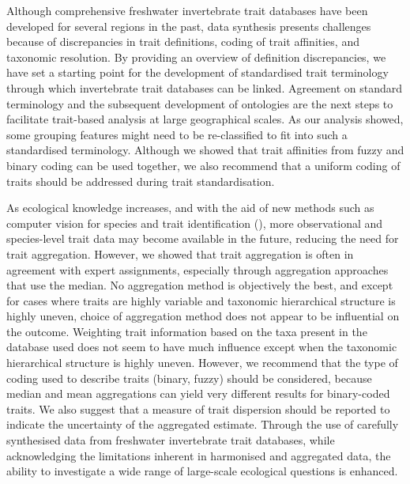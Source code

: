 \documentclass{article}
\begin{document}
Although comprehensive freshwater invertebrate trait databases have been developed for several regions in the past, data synthesis presents challenges because of discrepancies in trait definitions, coding of trait affinities, and taxonomic resolution. By providing an overview of definition discrepancies, we have set a starting point for the development of standardised trait terminology through which invertebrate trait databases can be linked. Agreement on standard terminology and the subsequent development of ontologies are the next steps to facilitate trait-based analysis at large geographical scales. As our analysis showed, some grouping features might need to be re-classified to fit into such a standardised terminology. Although we showed that trait affinities from fuzzy and binary coding can be used together, we also recommend that a uniform coding of traits should be addressed during trait standardisation. 

As ecological knowledge increases, and with the aid of new  methods such as computer vision for species and trait identification (\cite{hoye_deep_2020}), more observational and species-level trait data may become available in the future, reducing the need for trait aggregation. However, we showed that trait aggregation is often in agreement with expert assignments, especially through aggregation approaches that use the median. No aggregation method is objectively the best, and except for cases where traits are highly variable and taxonomic hierarchical structure is highly uneven, choice of aggregation method does not appear to be influential on the outcome. Weighting trait information based on the taxa present in the database used does not seem to have much influence except when the taxonomic hierarchical structure is highly uneven. However, we recommend that the type of coding used to describe traits (binary, fuzzy) should be considered, because median and mean aggregations can yield very different results for binary-coded traits. We also suggest that a measure of trait dispersion should be reported to indicate the uncertainty of the aggregated estimate. Through the use of carefully synthesised data from freshwater invertebrate trait databases, while acknowledging the limitations inherent in harmonised and aggregated data, the ability to investigate a wide range of large-scale ecological questions is enhanced.
 
\end{document}
